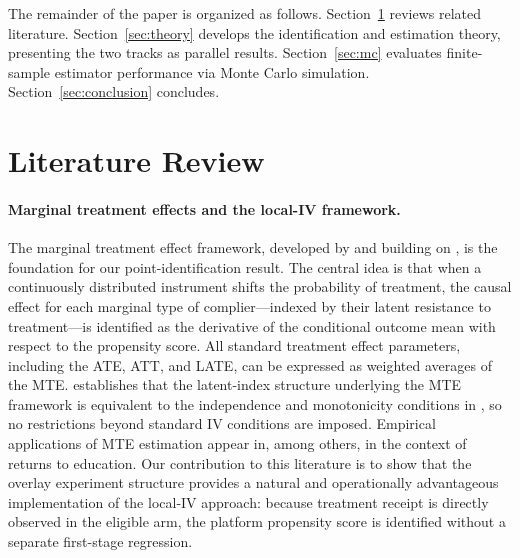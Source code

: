 \documentclass[11pt]{article}
\begin{document}
The remainder of the paper is organized as follows.  Section~\ref{sec:lit}
reviews related literature.  Section~\ref{sec:theory} develops the
identification and estimation theory, presenting the two tracks as parallel
results.  Section~\ref{sec:mc} evaluates finite-sample estimator performance via
Monte Carlo simulation.  Section~\ref{sec:conclusion} concludes.

\section{Literature Review}
\label{sec:lit}

\paragraph{Marginal treatment effects and the local-IV framework.}
The marginal treatment effect framework, developed by \citet{heckman2005structural}
and building on \citet{angrist1994identification}, is the foundation for our
point-identification result.  The central idea is that when a continuously
distributed instrument shifts the probability of treatment, the causal effect
for each marginal type of complier---indexed by their latent resistance to
treatment---is identified as the derivative of the conditional outcome mean with
respect to the propensity score.  All standard treatment effect parameters,
including the ATE, ATT, and LATE, can be expressed as weighted averages of the
MTE.  \citet{vytlacil2002independence} establishes that the latent-index
structure underlying the MTE framework is equivalent to the independence and
monotonicity conditions in \citet{angrist1994identification}, so no restrictions
beyond standard IV conditions are imposed.  Empirical applications of MTE
estimation appear in, among others, \citet{carneiro2011estimating} in the
context of returns to education.  Our contribution to this literature is to show
that the overlay experiment structure provides a natural and operationally
advantageous implementation of the local-IV approach: because treatment receipt
is directly observed in the eligible arm, the platform propensity score is
identified without a separate first-stage regression.
\end{document}
